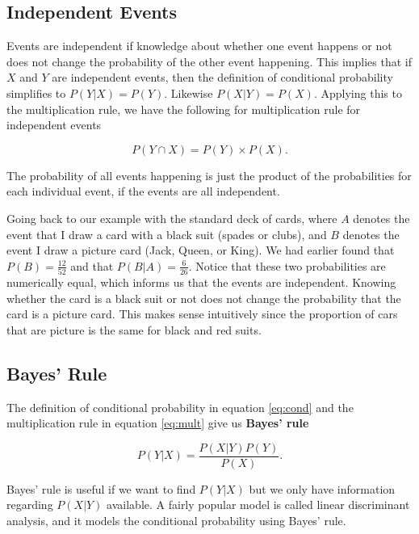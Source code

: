 \documentclass[
]{book}
\begin{document}
\hypertarget{independent-events}{%
\subsection{Independent Events}\label{independent-events}}

Events are independent if knowledge about whether one event happens or not does not change the probability of the other event happening. This implies that if \(X\) and \(Y\) are independent events, then the definition of conditional probability simplifies to \(P(Y|X) = P(Y)\). Likewise \(P(X|Y) = P(X)\). Applying this to the multiplication rule, we have the following for multiplication rule for independent events

\begin{equation} 
P(Y \cap X) = P(Y) \times P(X).
\label{eq:mult2}
\end{equation}

The probability of all events happening is just the product of the probabilities for each individual event, if the events are all independent.

Going back to our example with the standard deck of cards, where \(A\) denotes the event that I draw a card with a black suit (spades or clubs), and \(B\) denotes the event I draw a picture card (Jack, Queen, or King). We had earlier found that \(P(B) = \frac{12}{52}\) and that \(P(B|A) = \frac{6}{26}\). Notice that these two probabilities are numerically equal, which informs us that the events are independent. Knowing whether the card is a black suit or not does not change the probability that the card is a picture card. This makes sense intuitively since the proportion of cars that are picture is the same for black and red suits.

\hypertarget{bayes-rule}{%
\subsection{Bayes' Rule}\label{bayes-rule}}

The definition of conditional probability in equation \eqref{eq:cond} and the multiplication rule in equation \eqref{eq:mult} give us \textbf{Bayes' rule}

\begin{equation} 
P(Y|X) = \frac{P(X|Y)P(Y)}{P(X)}.
\label{eq:bayes}
\end{equation}

Bayes' rule is useful if we want to find \(P(Y|X)\) but we only have information regarding \(P(X|Y)\) available. A fairly popular model is called linear discriminant analysis, and it models the conditional probability using Bayes' rule.
\end{document}
